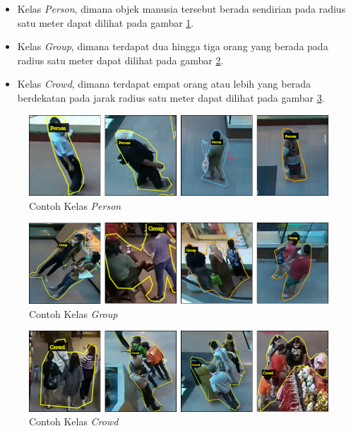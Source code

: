 \begin{itemize}
    \item Kelas \textit{Person}, dimana objek manusia tersebut berada sendirian pada radius satu meter dapat dilihat
    pada gambar \ref{fig: Kelas Person}.
    \item Kelas \textit{Group}, dimana terdapat dua hingga tiga orang yang berada pada radius satu meter dapat dilihat
    pada gambar \ref{fig: Kelas Group}.
    \item Kelas \textit{Crowd}, dimana terdapat empat orang atau lebih yang berada berdekatan pada jarak radius
        satu meter dapat dilihat pada gambar \ref{fig: Kelas Crowd}.
\end{itemize}

\begin{figure}[h!]
    \begin{center}
      \includegraphics[width= 0.8\linewidth]{bab4/Person_class_2.png}
      \caption{Contoh Kelas \textit{Person}}
      \label{fig: Kelas Person}
    \end{center}
\end{figure}

\begin{figure}[h!]
    \begin{center}
      \includegraphics[width= 0.8\linewidth]{bab4/Group_class_2.png}
      \caption{Contoh Kelas \textit{Group}}
      \label{fig: Kelas Group}
    \end{center}
\end{figure}

\begin{figure}[h!]
    \begin{center}
      \includegraphics[width= 0.8\linewidth]{bab4/Crowd_class_2.png}
      \caption{Contoh Kelas \textit{Crowd}}
      \label{fig: Kelas Crowd}
    \end{center}
\end{figure}

